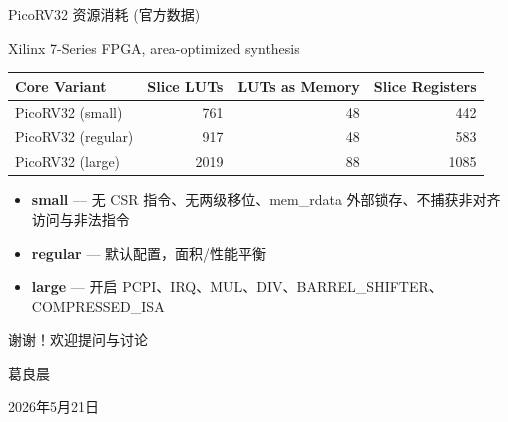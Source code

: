 \documentclass[aspectratio=169, 10pt, UTF8]{ctexbeamer}
\begin{document}
\begin{frame}{PicoRV32 资源消耗 (官方数据)}
  \begin{center}
    {\footnotesize Xilinx 7-Series FPGA, area-optimized synthesis}
  \end{center}
  \begin{table}[h]
    \centering
    \footnotesize
    \begin{tabular}{lrrr}
      \toprule
      \textbf{Core Variant} & \textbf{Slice LUTs} & \textbf{LUTs as Memory} & \textbf{Slice Registers} \\
      \midrule
      \rowcolor{ieeeGreen!12}
      PicoRV32 (small)   & 761  & 48 & 442  \\
      \rowcolor{ieeeBlue!8}
      PicoRV32 (regular) & 917  & 48 & 583  \\
      \rowcolor{ieeeOrange!12}
      PicoRV32 (large)   & 2019 & 88 & 1085 \\
      \bottomrule
    \end{tabular}
  \end{table}

  \begin{itemize}
    \item \textbf{small} — 无 CSR 指令、无两级移位、mem\_rdata 外部锁存、不捕获非对齐访问与非法指令
    \item \textbf{regular} — 默认配置，面积/性能平衡
    \item \textbf{large} — 开启 PCPI、IRQ、MUL、DIV、BARREL\_SHIFTER、COMPRESSED\_ISA
  \end{itemize}
\end{frame}
\begin{frame}[plain]
  \centering
  \vfill
  {\huge\color{ieeeBlue} 谢谢！欢迎提问与讨论}

  \vspace{20pt}
  {\large 葛良晨}

  \vspace{8pt}
  {\normalsize 2026年5月21日}
  \vfill
\end{frame}
\end{document}
